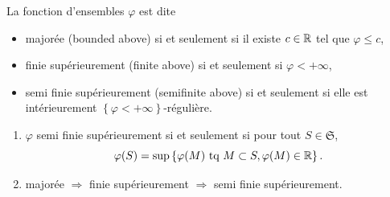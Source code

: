 \noindent La fonction d'ensembles $\varphi$ est dite
\begin{itemize}
 \item majorée (bounded above) si et seulement si il existe $c\in \mathbb{R}$ tel que $\varphi \leq c$,
 \item finie supérieurement (finite above) si et seulement si $\varphi < +\infty$,
 \item semi finie supérieurement (semifinite above) si et seulement si elle est intérieurement $\left\lbrace \varphi < + \infty\right\rbrace$-régulière.
\end{itemize}
\begin{rems}
 \begin{enumerate}
  \item $\varphi$ semi finie supérieurement si et seulement si pour tout $S \in \mathfrak{S}$,
  \begin{displaymath}
   \varphi(S) = \sup\left\lbrace \varphi(M)\text{ tq } M \subset S, \varphi(M) \in \mathbb{R}  \right\rbrace.
  \end{displaymath}
  \item majorée $\Rightarrow$ finie supérieurement $\Rightarrow$ semi finie supérieurement.
 \end{enumerate}
\end{rems}


